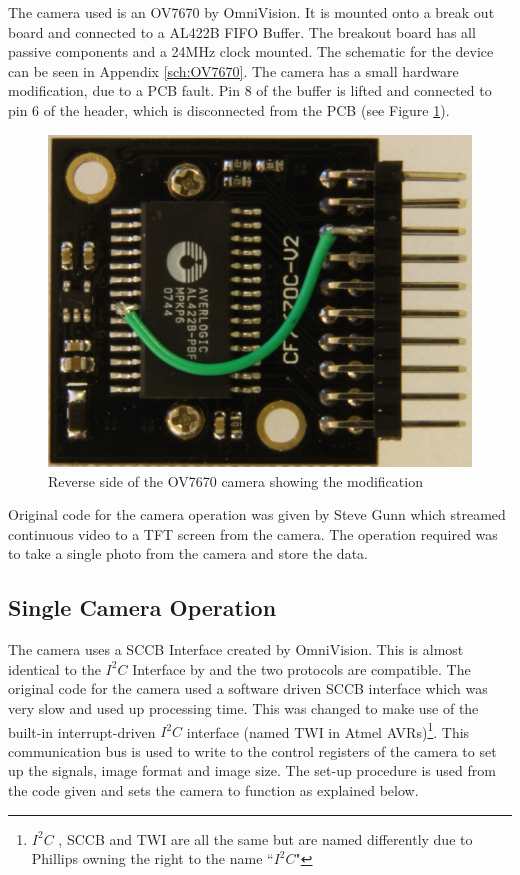 The camera used is an OV7670 by OmniVision. It is mounted onto a break out board and connected to a AL422B FIFO Buffer. The breakout board has all passive components and a 24MHz clock mounted. The schematic for the device can be seen in Appendix \ref{sch:OV7670}. The camera has a small hardware modification, due to a PCB fault. Pin 8 of the buffer is lifted and connected to pin 6 of the header, which is disconnected from the PCB (see Figure \ref{fig:OV7670:Mod}).
\begin{figure}
\centering
\includegraphics[width=\textwidth /4]{Figures/OV7670_Back.jpg}
\caption{Reverse side of the OV7670 camera showing the modification}
\label{fig:OV7670:Mod}
\end{figure}
Original code for the camera operation was given by Steve Gunn which streamed continuous video to a TFT screen from the camera. The operation required was to take a single photo from the camera and store the data. 

\subsection{Single Camera Operation}

The camera uses a SCCB Interface \citep{SCCB_Interface} created by OmniVision. This is almost identical to the $I^{2}C$ Interface by \cite{Philips:I2C} and the two protocols are compatible. The original code for the camera used a software driven SCCB interface which was very slow and used up processing time. This was changed to make use of the built-in interrupt-driven $I^{2}C$ interface (named TWI in Atmel AVRs)\footnote{$I^{2}C$ , SCCB and TWI are all the same but are named differently due to Phillips owning the right to the name ``$I^{2}C$"}. This communication bus is used to write to the control registers of the camera to set up the signals, image format and image size. The set-up procedure is used from the code given and sets the camera to function as explained below.

